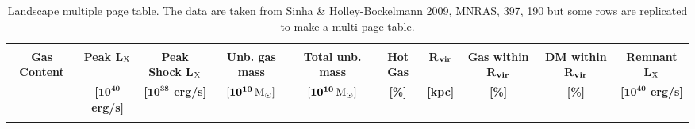 \documentclass{article}
\newcommand{\Msun}{{\rm M}_{\odot}}
\begin{document}
\begin{landscape}
\renewcommand{\thefootnote}{\fnsymbol{footnote}}
\renewcommand{\arraystretch}{0.81}
\scriptsize

\begin{longtable}{cccccccccc}
\caption[Landscape multiple page table]{Landscape multiple page table. The data
are taken from Sinha \& Holley-Bockelmann 2009, MNRAS, 397, 190 but some rows are
replicated to make a multi-page table. }
\label{table:mergers} \\

\hline \hline \\[-2ex]
   \multicolumn{1}{c}{\textbf{Gas Content}} &
   \multicolumn{1}{c}{\textbf{Peak L$\mathbf{_{\rm X}}$}\footnotemark[2]} &
   \multicolumn{1}{c}{\textbf{Peak Shock L$\mathbf{_{\rm X}}$}\footnotemark[3]} &
   \multicolumn{1}{c}{\textbf{Unb. gas mass}}  &
   \multicolumn{1}{c}{\textbf{Total unb. mass}} &
   \multicolumn{1}{c}{\textbf{Hot Gas}} &
   \multicolumn{1}{c}{\textbf{R$_{\rm \mathbf{vir}}$}} &
   \multicolumn{1}{c}{\textbf{Gas within \textbf{R$_{\rm \mathbf{vir}}$}}} &
   \multicolumn{1}{c}{\textbf{DM  within \textbf{R$_{\rm \mathbf{vir}}$}}} &
   \multicolumn{1}{c}{\textbf{Remnant L$_\mathbf{\rm X}$}} \\[0.8ex] 
   \multicolumn{1}{c}{\textbf{--}} &
   \multicolumn{1}{c}{\textbf{[$\mathbf{10^{40}}$ erg/s]}} &
   \multicolumn{1}{c}{\textbf{[$\mathbf{10^{38}}$ erg/s]}} &
   \multicolumn{1}{c}{$\mathbf{ [10^{10} \,\Msun ]}$} &
   \multicolumn{1}{c}{$\mathbf{ [10^{10} \,\Msun ]}$} &
   \multicolumn{1}{c}{\textbf{[\%]}} &
   \multicolumn{1}{c}{\textbf{[kpc]}} &
   \multicolumn{1}{c}{\textbf{[\%]}} &
   \multicolumn{1}{c}{\textbf{[\%]}} &
   \multicolumn{1}{c}{\textbf{[$\mathbf{10^{40}}$ erg/s]}} \\[0.5ex]\hline \hline \\[-2ex]
\endfirsthead



\end{longtable}
\end{landscape}
\end{document}
